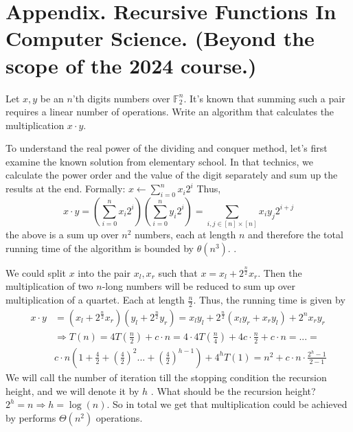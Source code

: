 \section{Appendix. Recursive Functions In Computer Science. (Beyond the scope of the 2024 course.)}




\begin{example}
Let \(x,y\) be an \(n\)'th digits numbers over \( \mathbb{F}^{n}_{2} \). It's known that summing such a pair requires a linear number of operations. Write an algorithm that calculates the multiplication \(x\cdot y\). 
\end{example}
\begin{example}
To understand the real power of the dividing and conquer method, let's first examine the known solution from elementary school.  In that technics, we calculate the power order and the value of the digit separately and sum up the results at the end. Formally: \(x \leftarrow \sum_{i=0}^{n}{x_{i}2^{i}}\) Thus, \[ x\cdot y =\left( \sum_{i=0}^{n}{x_{i}2^{i}} \right) \left( \sum_{i=0}^{n}{y_{i}2^{i}} \right) =  \sum_{i,j \in [n]\times[n] }{ x_{i}y_{j}2^{i+j} }\] the above is a sum up over \(n^2\) numbers, each at length \(n\) and therefore the total running time of the algorithm is bounded by \( \theta(n^3) \). .
\end{example}
\begin{example} We could split \(x\) into the pair \(x_{l}, x_{r}\) such that \(x = x_{l} + 2^{\frac{n}{2}}x_{r} \). Then the multiplication of two \(n\)-long numbers will be reduced to sum up over multiplication of a quartet. Each at length \(\frac{n}{2}\). Thus, the running time is given by \begin{equation*}
    \begin{split}
 x\cdot y & = \left(x_{l} + 2^{\frac{n}{2}}x_{r}\right)\left(y_{l} + 2^{\frac{n}{2}}y_{r}\right) = x_{l}y_{l} + 2^{\frac{n}{2}} \left( x_{l}y_{r} + x_{r}y_{l} \right) + 2^{n}x_{r}y_{r} \\ &  \Rightarrow T\left(n\right)  =4T\left(\frac{n}{2}\right)+c\cdot n=4\cdot4T\left(\frac{n}{4}\right)+4c\cdot\frac{n}{2}+c\cdot n = ... = \\ & c\cdot n\left(1+\frac{4}{2}+\left(\frac{4}{2}\right)^{2}...+\left(\frac{4}{2}\right)^{h-1}\right) + 4^{h}T(1) = n^{2} + c\cdot n\cdot\frac{2^{h}-1}{2-1}
    \end{split}
\end{equation*}
We will call the number of iteration till the stopping condition the recursion height, and we will denote it by \(h\) . What should be the recursion height? \( 2^{h} = n \Rightarrow h =\log\left(n\right) \). So in total we get that multiplication could be achieved by performs \( \Theta\left(n^2\right)\) operations. 
\end{example}
